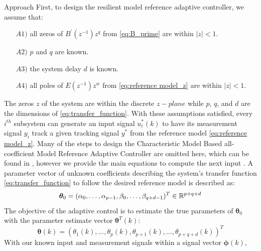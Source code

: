 \begin{section}{Approach}
First, to design the resilient model reference adaptive controller, we assume that:
	\begin{enumerate}[leftmargin=3\parindent]
	\item[$A1)$] all zeros of $B^{'}(z^{-1})z^q$ from \eqref{eq:B_prime} are within $|z|<1$. 
	\item[$A2)$] $p$ and $q$ are known. 
	\item[$A3)$] the system delay $d$ is known.
	\item[$A4)$] all poles of $E(z^{-1})z^w$ from \eqref{eq:reference model_z} are within $|z|<1$.
	\end{enumerate}
The zeros $z$ of the system are within the discrete $z-plane$ while $p$, $q$, and $d$ are the dimensions of \eqref{eq:transfer_function}. With these assumptions satisfied, every $i^{th}$ subsystem can generate an input signal $u^*_i(k)$ to have its measurement signal $y_i$ track a given tracking signal $y^*$ from the reference model \eqref{eq:reference model_z}. Many of the steps to design the Characteristic Model Based all-coefficient Model Reference Adaptive Controller are omitted here, which can be found in \cite{tao2003adaptive,Goodwin1643720}, however we provide the main equations to compute the next input . A parameter vector of unknown coefficients describing the system's transfer function \eqref{eq:transfer_function} to follow the desired reference model is described as:
    \begin{equation}
	\bm{\theta}_0=(\alpha_0, \dots ,\alpha_{p-1},\beta_0, \dots ,\beta_{q+d-1})^T \in \mathbb{R}^{p+q+d}
	\end{equation}
The objective of the adaptive control is to estimate the true parameters of $\bm{\theta}_0$ with the parameter estimate vector $\bm{\theta}^T(k)$:
    \begin{equation}
    \bm{\theta}(k)=(\theta_1(k), \dots ,\theta_p(k),\theta_{p+1}(k), \dots ,\theta_{p+q+d}(k))^T
	\end{equation}
With our known input and measurement signals within a signal vector $\bm{\phi}(k)$,
    

\end{section}
